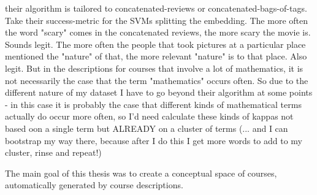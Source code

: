 \documentclass[11pt,
  paper=a4, 
  hidelinks,
  bibliography=totocnumbered,
	captions=tableheading,
	BCOR=10mm
]{scrreprt}
\theoremstyle{definition}
\begin{document}
their algorithm is tailored to concatenated-reviews or concatenated-bags-of-tags. Take their success-metric for the SVMs splitting the embedding. The more often the word "scary" comes in the concatenated reviews, the more scary the movie is. Sounds legit. The more often the people that took pictures at a particular place mentioned the "nature" of that, the more relevant "nature" is to that place. Also legit. But in the descriptions for courses that involve a lot of mathematics, it is not necessarily the case that the term "mathematics" occurs often. So due to the different nature of my dataset I have to go beyond their algorithm at some points - in this case it is probably the case that different kinds of mathematical terms actually do occur more often, so I'd need calculate these kinds of kappas not based oon a single term but ALREADY on a cluster of terms (... and I can bootstrap my way there, because after I do this I get more words to add to my cluster, rinse and repeat!)






The main goal of this thesis was to create a conceptual space of courses, automatically generated by course descriptions.
\end{document}
